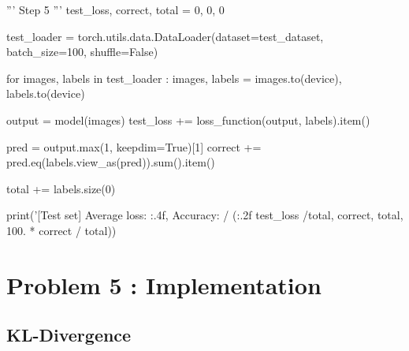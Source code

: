 \documentclass[10pt]{article}
\begin{document}
\begin{python}
'''
Step 5
'''
test_loss, correct, total = 0, 0, 0

test_loader = torch.utils.data.DataLoader(dataset=test_dataset, batch_size=100, shuffle=False)

for images, labels in test_loader :
    images, labels = images.to(device), labels.to(device)

    output = model(images)
    test_loss += loss_function(output, labels).item()

    pred = output.max(1, keepdim=True)[1]
    correct += pred.eq(labels.view_as(pred)).sum().item()
    
    total += labels.size(0)
            
print('[Test set] Average loss: {:.4f}, Accuracy: {}/{} ({:.2f}%
        test_loss /total, correct, total,
        100. * correct / total))
 
\end{python}


\appendix
\section{Problem 5 : Implementation}
\subsection{KL-Divergence}
\end{document}

